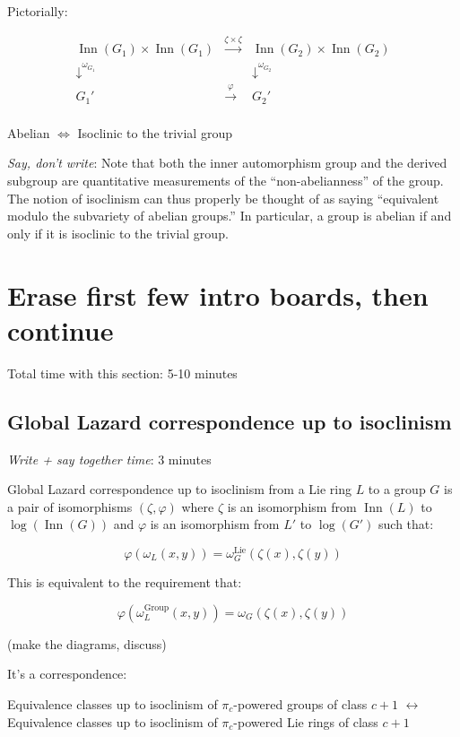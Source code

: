 \documentclass[10pt]{amsart}
\begin{document}
Pictorially:

$$\begin{array}{ccc}
  \operatorname{Inn}(G_1) \times \operatorname{Inn}(G_1) & \stackrel{\zeta \times \zeta}{\to} & \operatorname{Inn}(G_2) \times \operatorname{Inn}(G_2) \\
  \downarrow^{\omega_{G_1}}  & & \downarrow^{\omega_{G_2}}\\
  G_1' & \stackrel{\varphi}{\to} & G_2'\\
\end{array}$$

Abelian $\iff$ Isoclinic to the trivial group

{\em Say, don't write}: Note that both the inner automorphism group
and the derived subgroup are quantitative measurements of the
``non-abelianness'' of the group. The notion of isoclinism can thus
properly be thought of as saying ``equivalent modulo the subvariety of
abelian groups.'' In particular, a group is abelian if and only if it
is isoclinic to the trivial group.

\section{Erase first few intro boards, then continue}

Total time with this section: 5-10 minutes

\subsection{Global Lazard correspondence up to isoclinism}

{\em Write + say together time}: 3 minutes

Global Lazard correspondence up to isoclinism from a Lie ring $L$ to a
group $G$ is a pair of isomorphisms $(\zeta,\varphi)$ where $\zeta$ is
an isomorphism from $\operatorname{Inn}(L)$ to
$\log(\operatorname{Inn}(G))$ and $\varphi$ is an isomorphism from
$L'$ to $\log(G')$ such that:

$$\varphi(\omega_L(x,y)) = \omega^{\text{Lie}}_G(\zeta(x),\zeta(y))$$

This is equivalent to the requirement that:

$$\varphi(\omega^{\text{Group}}_L(x,y)) = \omega_G(\zeta(x),\zeta(y))$$

(make the diagrams, discuss)

It's a correspondence:

Equivalence classes up to isoclinism of $\pi_c$-powered groups of class $c + 1$ $\leftrightarrow$ Equivalence classes  up to isoclinism of $\pi_c$-powered Lie rings of class $c + 1$
\end{document}

